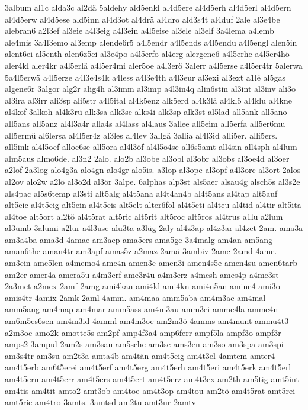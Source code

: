 {3album
al1c
alda3c
al2dä
5aldehy
ald5enkl
al4d5ere
al4d5erh
al4d5erl
al4d5ern
al4d5erw
al4d5ese
ald5inn
al4d3ot
al4drä
al4dro
ald3s4t
al4duf
2ale
al3e4be
alebran6
a2l3ef
al3eie
a4l3eig
a4l3ein
a4l5eise
al3ele
al3elf
3a4lema
a4lemb
ale4mis
3a4l3emo
al3emp
alende6r5
a4l5endr
a4l5ends
a4l5endu
a4l5engl
alen5in
alent6ei
al5enth
alen6z5ei
al3e4po
a4l5erfo
al4erg
alergene6
a4l5erhe
a4l5er4hö
aler4kl
aler4kr
a4l5erlä
a4l5er4mi
aler5oe
a4l3erö
3alerr
a4l5erse
a4l5er4tr
5alerwa
5a4l5erwä
a4l5erze
a4l3e4s4k
a4less
a4l3e4th
a4l3eur
al3exi
al3ext
a1lé
al5gas
algene6r
3algor
alg2r
alig4h
al3imm
al3imp
a4l3in4q
alin6stin
al3int
al3inv
ali3o
al3ira
al3irr
ali3sp
ali5str
a4l5ital
al4k5enz
alk5erd
al4k3lä
al4klö
al4klu
al4kne
al4kof
3alkoh
al4k3rü
alk3sa
alk3se
alks4i
alk3sp
alk3st
al5lad
all5ank
all5ano
all5ans
all5anz
al4l3a4r
alla4s
al4lass
al4laus
3allee
all5eim
all5erfa
all5er6mu
all5ermü
al6lersa
al4l5er4z
al3les
al4lev
3allgä
3allia
al4l3id
alli5er.
alli5ers.
all5ink
al4l5oef
alloe6se
all5ora
al4l3öf
al4l5ö4se
all6s5amt
all4sin
all4sph
al4lum
alm5aus
almo6de.
al3n2
2alo.
alo2b
al3obe
al3obl
al3obr
al3obs
al3oe4d
al3oer
a2lof
2a3log
alo4g3a
alo4gn
alo4gr
alo5is.
a3lop
al3ope
al3opf
a4l3orc
al3ort
2alos
al2ov
alo2w
a2lö
al3ö2d
al3ör
3alpe.
6alphas
alp3st
als5aer
alsau4g
alsch5s
al3s2e
als4pac
al5s6temp
al3sti
alt5alg
al4t5ana
al4t4an4b
al4t5ans
al4tap
alt5auf
alt5eic
al4t5eig
alt5ein
al4t5eis
alt5elt
alter6fol
al4t5eti
al4teu
al4tid
al4tir
alt5ita
al4toe
alt5ort
al2tö
al4t5rat
alt5ric
alt5rit
alt5roc
alt5ros
al4trus
a1lu
a2lum
al3umb
3alumi
a2lur
a4l3use
alu3ta
a3lüg
2aly
al4z3ap
al4z3ar
al4zet
2am.
ama3a
am3a4ba
ama3d
4amae
am3aep
ama5ers
ama5ge
3a4malg
am4an
am5ang
aman6the
aman4tr
am3apf
amas5z
a2maz
2amä
3ambiv
2amc
2amd
4ame.
am3ein
ame5len
a4memo4
ame4n
amen3e
amen3i
amen4s5e
amen4su
amen6tarb
am2er
amer4a
amera5u
a4m3erf
ame3r4u
a4m3erz
a4mesh
ames4p
a4me3st
2a3met
a2mex
2amf
2amg
ami4kan
ami4kl
ami4kn
ami4n5an
amine4
ami3o
amis4tr
4amix
2amk
2aml
4amm.
am4maa
amm5aba
am4m3ac
am4mal
amm5ang
am4map
am4mar
amm5ass
am4m3au
amm3ei
amme4la
amme4n
am6m5es6sen
am4m3id
4amml
am4m3oe
am2m3ö
4amms
am4munt
ammu4t3
a2m3oc
amo2k
amotte5s
am2pf
amp4f3a4
amp6ferr
ampf5la
ampf3o
ampf3r
amps2
3ampul
2am2s
am3sau
am5sche
am3se
ams3en
am3so
am3spa
am3spi
am3s4tr
am3su
am2t3a
amta4b
am4tän
am4t5eig
am4t3el
4amtem
amter4
am4t5erb
am6t5erei
am4t5erf
am4t5erg
am4t5erh
am4t5eri
am4t5erk
am4t5erl
am4t5ern
am4t5err
am4t5ers
am4t5ert
am4t5erz
am4t3ex
am2th
am5tig
amt5int
am4tis
am4tit
amto2
amt3ob
am4toe
am4t3op
am4tou
am2tö
am4t5rat
amt5rei
amt5ric
am4tro
3amts.
3amtsd
am2tu
amt3ur
2amtv
}
